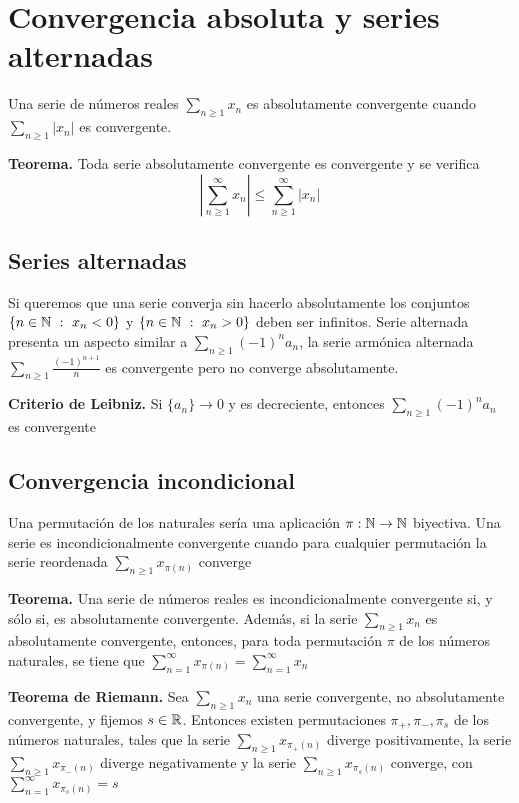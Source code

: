 \section{Convergencia absoluta y series alternadas}
Una serie de números reales $\sum_{n\geq 1} x_n$ es absolutamente convergente cuando $\sum_{n\geq 1} |x_n|$ es convergente. 


\textbf{Teorema.} Toda serie absolutamente convergente es convergente y se verifica
$$ \left|\sum_{n\geq 1}^{\infty} x_n\right| \leq \sum_{n\geq 1}^{\infty} |x_n| $$

\subsection{Series alternadas}
Si queremos que una serie converja sin hacerlo absolutamente los conjuntos $\{n\in\mathbb{N} \ : \ x_n<0\}$ y $\{n\in\mathbb{N} \ : \ x_n>0\}$ deben ser infinitos.
Serie alternada presenta un aspecto similar a $\sum_{n\geq 1}(-1)^n a_n$, la serie armónica alternada $\sum_{n\geq 1}\frac{(-1)^{n+1}}{n}$ es convergente pero no converge absolutamente.

\textbf{Criterio de Leibniz.} Si $\{a_n\} \rightarrow 0$ y es decreciente, entonces $\sum_{n\geq 1} (-1)^n a_n$ es convergente

\subsection{Convergencia incondicional}
Una permutación de los naturales sería una aplicación $\pi : \mathbb{N} \rightarrow \mathbb{N}$ biyectiva. Una serie es incondicionalmente convergente cuando para cualquier permutación la serie reordenada $\sum_{n\geq 1}x_{\pi (n)}$ converge

\textbf{Teorema.} Una serie de números reales es incondicionalmente convergente si, y sólo si, es absolutamente convergente. 
Además, si la serie $\sum_{n\geq 1}x_n$ es absolutamente convergente, entonces, para toda permutación $\pi$ de los números naturales, se tiene que $\sum_{n=1}^{\infty}x_{\pi (n)} = \sum_{n=1}^{\infty}x_n$

\textbf{Teorema de Riemann.} Sea $\sum_{n\geq 1}x_n$ una serie convergente, no absolutamente convergente, y fijemos $s\in\mathbb{R}$. Entonces existen permutaciones $\pi_+, \pi_-, \pi_s$ de los números naturales, tales que la serie $\sum_{n\geq 1}x_{\pi_+ (n)}$ diverge positivamente, la serie $\sum_{n\geq 1}x_{\pi_- (n)}$ diverge negativamente y la serie $\sum_{n\geq 1}x_{\pi_s (n)}$ converge, con $\sum_{n=1}^{\infty}x_{\pi_s (n)} = s$